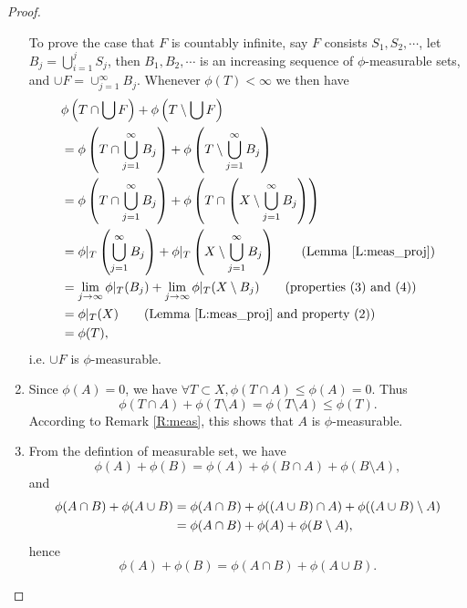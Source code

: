\begin{proof}
\begin{enumerate}
  To prove the case that $F$ is countably infinite, say $F$ consists
  $S_1,S_2,\cdots$, let $B_j=\bigcup_{i=1}^j S_j$, then $B_1,B_2,\cdots$ is an
  increasing sequence of $\phi$-measurable sets, and 
  $\cup F=\cup_{j=1}^{\infty} B_j$. Whenever $\phi(T)<\infty$ we then have
  \begin{align*}
    & \phi\left(T\cap\bigcup F\right) + \phi\left(T\setminus\bigcup F\right)
      \notag \\
    &= \phi\left(T\cap\bigcup_{j=1}^{\infty} B_j\right) 
      + \phi\left(T\setminus \bigcup_{j=1}^{\infty} B_j \right)
      \notag \\
    &= \phi\left(T\cap\bigcup_{j=1}^{\infty} B_j\right) 
      + \phi\left(T\cap \left(X\setminus \bigcup_{j=1}^{\infty}B_j\right)\right)
      \notag \\
    &= \phi|_T \left(\bigcup_{j=1}^{\infty} B_j\right) 
      + \phi|_T \left( X\setminus \bigcup_{j=1}^{\infty} B_j \right)
      \qquad \text{(Lemma \ref{L:meas_proj})}   \notag \\
    &= \lim_{j\to\infty} \phi|_T(B_j) + \lim_{j\to\infty}\phi|_T(X\setminus B_j) 
       \qquad \text{(properties (3) and (4))}   \notag \\
    &= \phi|_T(X) 
       \qquad \text{(Lemma \ref{L:meas_proj} and property (2))} \notag \\
    &= \phi(T),  \notag \\
  \end{align*}
  i.e. $\cup F$ is $\phi$-measurable.
  \item Since $\phi(A)=0$, we have 
    $\forall T\subset X, \phi(T\cap A)\le \phi(A)=0$. Thus
    \[
      \phi(T\cap A)+\phi(T\setminus A)=\phi(T\setminus A)\le \phi(T).
    \]
    According to Remark \ref{R:meas}, this shows that $A$ is $\phi$-measurable.
  \item From the defintion of measurable set, we have
    \[
      \phi(A)+\phi(B)=\phi(A)+\phi(B\cap A)+\phi(B\setminus A),
    \]
    and 
    \begin{align*}
      \phi(A\cap B)+\phi(A\cup B)
      &=\phi(A\cap B)+\phi((A\cup B)\cap A)+\phi((A\cup B)\setminus A) \notag \\
      &=\phi(A\cap B)+\phi(A)+\phi(B\setminus A),  \notag \\
    \end{align*}
    hence
    \[
      \phi(A)+\phi(B)=\phi(A\cap B)+\phi(A\cup B).
    \]
\end{enumerate}
\end{proof}



